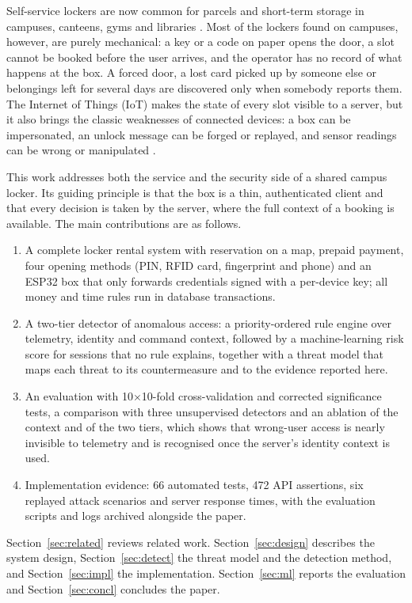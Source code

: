 Self-service lockers are now common for parcels and short-term storage in campuses, canteens, gyms
and libraries \cite{iwan2016parcel}. Most of the lockers found on campuses, however, are purely mechanical: a key or a
code on paper opens the door, a slot cannot be booked before the user arrives, and the operator has no record of what
happens at the box. A forced door, a lost card picked up by someone else or belongings left for several days are
discovered only when somebody reports them. The Internet of Things (IoT) \cite{alfuqaha2015iot} makes the state of
every slot visible to a server, but it also brings the classic weaknesses of connected devices: a box can be
impersonated, an unlock message can be forged or replayed, and sensor readings can be wrong or manipulated
\cite{sicari2015security, roman2013features}.

This work addresses both the service and the security side of a shared campus locker. Its guiding principle is that
the box is a thin, authenticated client and that every decision is taken by the server, where the full context of a
booking is available. The main contributions are as follows.
\begin{enumerate}
  \item A complete locker rental system with reservation on a map, prepaid payment, four opening methods (PIN, RFID
        card, fingerprint and phone) and an ESP32 box that only forwards credentials signed with a per-device key; all
        money and time rules run in database transactions.
  \item A two-tier detector of anomalous access: a priority-ordered rule engine over telemetry, identity and command
        context, followed by a machine-learning risk score for sessions that no rule explains, together with a threat
        model that maps each threat to its countermeasure and to the evidence reported here.
  \item An evaluation with 10$\times$10-fold cross-validation and corrected significance tests, a comparison with three
        unsupervised detectors and an ablation of the context and of the two tiers, which shows that wrong-user access
        is nearly invisible to telemetry and is recognised once the server's identity context is used.
  \item Implementation evidence: 66 automated tests, 472 API assertions, six replayed attack scenarios and server
        response times, with the evaluation scripts and logs archived alongside the paper.
\end{enumerate}
Section~\ref{sec:related} reviews related work. Section~\ref{sec:design} describes the system design,
Section~\ref{sec:detect} the threat model and the detection method, and Section~\ref{sec:impl} the implementation.
Section~\ref{sec:ml} reports the evaluation and Section~\ref{sec:concl} concludes the paper.

